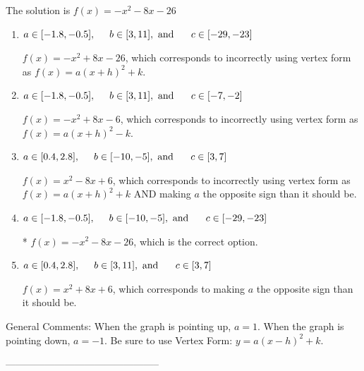 \documentclass{extbook}[14pt]
\begin{document}
The solution is $ f(x) = -x^{2} -8 x -26 $ 

\begin{enumerate}[label=\Alph*.] 
\item $ a \in [-1.8, -0.5], \hspace*{5mm} b \in [3, 11], \text{ and } \hspace*{5mm} c \in [-29, -23] $ 

 $f(x)=-x^{2} +8 x -26$, which corresponds to incorrectly using vertex form as $f(x) = a(x+h)^2+k$. 
\item $ a \in [-1.8, -0.5], \hspace*{5mm} b \in [3, 11], \text{ and } \hspace*{5mm} c \in [-7, -2] $ 

 $f(x)=-x^{2} +8 x -6$, which corresponds to incorrectly using vertex form as $f(x) = a(x+h)^2 - k$. 
\item $ a \in [0.4, 2.8], \hspace*{5mm} b \in [-10, -5], \text{ and } \hspace*{5mm} c \in [3, 7] $ 

 $f(x)=x^{2} -8 x + 6$, which corresponds to incorrectly using vertex form as $f(x) = a(x+h)^2+k$ AND making $a$ the opposite sign than it should be. 
\item $ a \in [-1.8, -0.5], \hspace*{5mm} b \in [-10, -5], \text{ and } \hspace*{5mm} c \in [-29, -23] $ 

 * $f(x)=-x^{2} -8 x -26$, which is the correct option. 
\item $ a \in [0.4, 2.8], \hspace*{5mm} b \in [3, 11], \text{ and } \hspace*{5mm} c \in [3, 7] $ 

 $f(x)=x^{2} +8 x + 6$, which corresponds to making $a$ the opposite sign than it should be. 
\end{enumerate} 
 
General Comments: When the graph is pointing up, $a=1$. When the graph is pointing down, $a=-1$. Be sure to use Vertex Form: $y = a(x-h)^2+k$.

-----------------------------------------------
\end{document}

